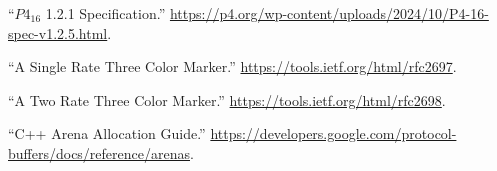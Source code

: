 \documentclass[11pt]{article}
\begin{document}
{%
{%
\begin{thebibliography}{45}%
\label{sec-bibliography}%

\mdbibitemlabel{{}[1]}\textquotedblleft{}$P4_{16}$ 1.2.1 Specification.\textquotedblright{} \href{https://p4.org/wp-content/uploads/2024/10/P4-16-spec-v1.2.5.html}{{\ttfamily https://\hspace{0pt}p4.\hspace{0pt}org/\hspace{0pt}wp-\hspace{0pt}content/\hspace{0pt}uploads/\hspace{0pt}2024/\hspace{0pt}10/\hspace{0pt}P4-\hspace{0pt}16-\hspace{0pt}spec-\hspace{0pt}v1.\hspace{0pt}2.\hspace{0pt}5.\hspace{0pt}html}}.\label{p4spec}%

\mdbibitemlabel{{}[2]}\textquotedblleft{}A Single Rate Three Color Marker.\textquotedblright{} \href{https://tools.ietf.org/html/rfc2697}{{\ttfamily https://\hspace{0pt}tools.\hspace{0pt}ietf.\hspace{0pt}org/\hspace{0pt}html/\hspace{0pt}rfc2697}}.\label{rfc2697}%

\mdbibitemlabel{{}[3]}\textquotedblleft{}A Two Rate Three Color Marker.\textquotedblright{} \href{https://tools.ietf.org/html/rfc2698}{{\ttfamily https://\hspace{0pt}tools.\hspace{0pt}ietf.\hspace{0pt}org/\hspace{0pt}html/\hspace{0pt}rfc2698}}.\label{rfc2698}%

\mdbibitemlabel{{}[4]}\textquotedblleft{}C++ Arena Allocation Guide.\textquotedblright{} \href{https://developers.google.com/protocol-buffers/docs/reference/arenas}{{\ttfamily https://\hspace{0pt}developers.\hspace{0pt}google.\hspace{0pt}com/\hspace{0pt}protocol-\hspace{0pt}buffers/\hspace{0pt}docs/\hspace{0pt}reference/\hspace{0pt}arenas}}.\label{arenaallocation}%


\end{thebibliography}}}
\end{document}
